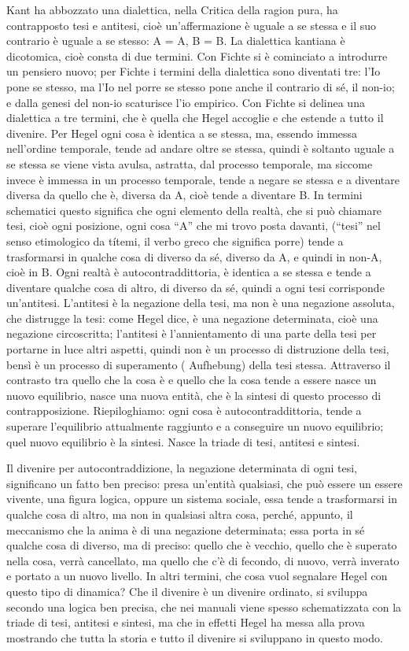 \documentclass[a4paper,12pt,oneside,openany]{book}%
\begin{document}
Kant ha abbozzato una dialettica, nella Critica della ragion pura, ha contrapposto tesi e antitesi, cioè un’affermazione è uguale a se stessa e il suo contrario è uguale a se stesso: A = A, B = B. La dialettica kantiana è dicotomica, cioè consta di due termini. Con Fichte si è cominciato a introdurre un pensiero nuovo; per Fichte i termini della dialettica sono diventati tre: l’Io pone se stesso, ma l’Io nel porre se stesso pone anche il contrario di sé, il non-io; e dalla genesi del non-io scaturisce l’io empirico. Con Fichte si delinea una dialettica a tre termini, che è quella che Hegel accoglie e che estende a tutto il divenire. Per Hegel ogni cosa è identica a se stessa, ma, essendo immessa nell’ordine temporale, tende ad andare oltre se stessa, quindi è soltanto uguale a se stessa se viene vista avulsa, astratta, dal processo temporale, ma siccome invece è immessa in un processo temporale, tende a negare se stessa e a diventare diversa da quello che è, diversa da A, cioè tende a diventare B. In termini schematici questo significa che ogni elemento della realtà, che si può chiamare tesi, cioè ogni posizione, ogni cosa “A” che mi trovo posta davanti, (“tesi” nel senso etimologico da títemi, il verbo greco che significa porre) tende a trasformarsi in qualche cosa di diverso da sé, diverso da A, e quindi in non-A, cioè in B. Ogni realtà è autocontraddittoria, è identica a se stessa e tende a diventare qualche cosa di altro, di diverso da sé, quindi a ogni tesi corrisponde un’antitesi. L’antitesi è la negazione della tesi, ma non è una negazione assoluta, che distrugge la tesi: come Hegel dice, è una negazione determinata, cioè una negazione circoscritta; l’antitesi è l’annientamento di una parte della tesi per portarne in luce altri aspetti, quindi non è un processo di distruzione della tesi, bensì è un processo di superamento ( Aufhebung) della tesi stessa. Attraverso il contrasto tra quello che la cosa è e quello che la cosa tende a essere nasce un nuovo equilibrio, nasce una nuova entità, che è la sintesi di questo processo di contrapposizione. Riepiloghiamo: ogni cosa è autocontraddittoria, tende a superare l’equilibrio attualmente raggiunto e a conseguire un nuovo equilibrio; quel nuovo equilibrio è la sintesi. Nasce la triade di tesi, antitesi e sintesi.

Il divenire per autocontraddizione, la negazione determinata di ogni tesi, significano un fatto ben preciso: presa un’entità qualsiasi, che può essere un essere vivente, una figura logica, oppure un sistema sociale, essa tende a trasformarsi in qualche cosa di altro, ma non in qualsiasi altra cosa, perché, appunto, il meccanismo che la anima è di una negazione determinata; essa porta in sé qualche cosa di diverso, ma di preciso: quello che è vecchio, quello che è superato nella cosa, verrà cancellato, ma quello che c’è di fecondo, di nuovo, verrà inverato e portato a un nuovo livello. In altri termini, che cosa vuol segnalare Hegel con questo tipo di dinamica? Che il divenire è un divenire ordinato, si sviluppa secondo una logica ben precisa, che nei manuali viene spesso schematizzata con la triade di tesi, antitesi e sintesi, ma che in effetti Hegel ha messa alla prova mostrando che tutta la storia e tutto il divenire si sviluppano in questo modo.	
	
\end{document}
